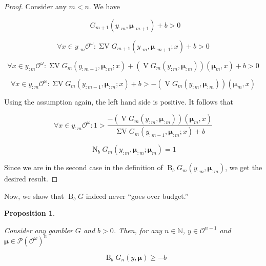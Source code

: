 \documentclass[11pt]{article}
\theoremstyle{definition}
\theoremstyle{plain}
\newtheorem{proposition}{Proposition}%
\newcommand{\Nats}{\mathbb{N}}
\newcommand{\B}{\operatorname{B}}
\newcommand{\PM}{\mathcal{P}}
\newcommand{\Ob}{\mathcal{O}}
\newcommand{\OO}{\Ob^\omega}
\newcommand{\PMO}{\PM(\OO)}
\DeclareMathOperator{\V}{V}
\DeclareMathOperator{\SV}{\Sigma V}
\DeclareMathOperator{\SVM}{\Sigma V_{\min}}
\DeclareMathOperator{\Nr}{N}
\newcommand{\BM}{\bm{\mu}}
\begin{document}
\begin{proof}

Consider any $m < n$. We have

$$\SVM G_{m+1}(y_{:m},\BM_{:m+1}) + b > 0$$

$$\forall x \in y_{:m}\OO: \SV G_{m+1}(y_{:m},\BM_{:m+1}; x) + b > 0$$

$$\forall x \in y_{:m}\OO: \SV G_{m}(y_{:m-1},\BM_{:m}; x) + (\V G_{m}(y_{:m},\BM_{:m}))(\BM_{m}, x) + b > 0$$

$$\forall x \in y_{:m}\OO: \SV G_{m}(y_{:m-1},\BM_{:m}; x) + b > -(\V G_{m}(y_{:m},\BM_{:m}))(\BM_{m}, x)$$

Using the assumption again, the left hand side is positive. It follows that

$$\forall x \in y_{:m}\OO: 1 > \frac{-(\V G_{m}(y_{:m},\BM_{:m}))(\BM_{m}, x)}{\SV G_{m}(y_{:m-1},\BM_{:m}; x) + b}$$

$$\Nr_b G_m(y_{:m},\BM_{:m};\BM_m) = 1$$

Since we are in the second case in the definition of ${\B_b G_m(y_{:m},\BM_{:m})}$, we get the desired result.

\end{proof}

Now, we show that $\B_b G$ indeed never \enquote{goes over budget.}

\begin{proposition}
\label{prp:b_stays_in_budget}

Consider any gambler $G$ and $b > 0$. Then, for any $n \in \Nats$, $y \in \Ob^{n-1}$ and $\BM \in \PMO^n$

\begin{equation}
\SVM \B_b G_n(y,\BM) \geq -b
\end{equation} 

\end{proposition}
\end{document}
